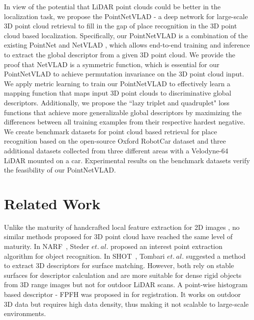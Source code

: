 \documentclass[10pt,twocolumn,letterpaper]{article}
\begin{document}
In view of the potential that LiDAR point clouds could be better in the localization task, we propose the PointNetVLAD - a deep network for large-scale 3D point cloud retrieval to fill in the gap of place recognition in the 3D point cloud based localization. Specifically, our PointNetVLAD
is a combination of the existing PointNet \cite{qi2016pointnet} and NetVLAD \cite{Arandjelovic16}, which allows end-to-end training and inference to extract the global descriptor from a given 3D point cloud. We provide the proof that NetVLAD is a symmetric function, which is essential for our PointNetVLAD to achieve permutation invariance on the 3D point cloud input. We apply metric learning \cite{Chopra:2005} to train our PointNetVLAD to effectively learn a mapping function that maps input 3D point clouds to discriminative global descriptors. Additionally, we propose the ``lazy triplet and quadruplet" loss functions that achieve more generalizable global descriptors by maximizing the differences between all training examples from their respective hardest negative. We create benchmark datasets for point cloud based retrieval for place recognition based on the open-source Oxford RobotCar dataset \cite{RobotCarDatasetIJRR} and three additional datasets collected from three different areas with a Velodyne-64 LiDAR mounted on a car. Experimental results on the benchmark datasets verify the feasibility of our PointNetVLAD.  	\section{Related Work}



Unlike the maturity of handcrafted local feature extraction for 2D images \cite{Lowe:2004,Bay:2008}, no similar methods proposed for 3D point cloud have reached the same level of maturity. 
In NARF~\cite{Steder:2010}, Steder $et.~al.$ proposed an interest point extraction algorithm for object recognition. In SHOT~\cite{Tombari:2010}, Tombari $et.~al.$  suggested a method to extract 3D descriptors for surface matching. However, both \cite{Steder:2010,Tombari:2010} rely on stable surfaces for descriptor calculation and are more suitable for dense rigid objects from 3D range images but not for outdoor LiDAR scans. A point-wise histogram based descriptor - FPFH was proposed in \cite{Rusu:2009,Radu:2008} for registration. It works on outdoor 3D data but requires high data density, thus making it not scalable to large-scale environments.
\end{document}
